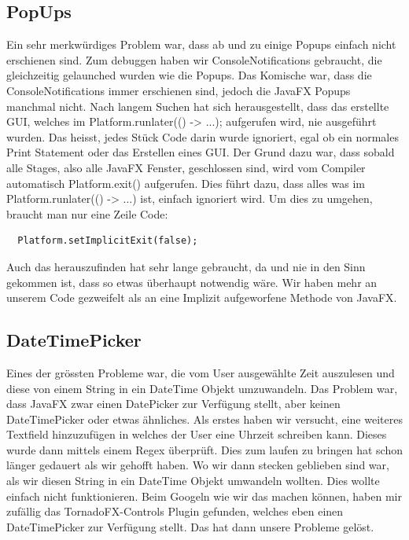 \documentclass[11pt,titelpage]{scrartcl}
\begin{document}
\subsection{PopUps}
Ein sehr merkwürdiges Problem war, dass ab und zu einige Popups einfach nicht erschienen sind. Zum debuggen haben wir ConsoleNotifications gebraucht, die gleichzeitig gelaunched wurden wie die Popups. Das Komische war, dass die ConsoleNotifications immer erschienen sind, jedoch die JavaFX Popups manchmal nicht. Nach langem Suchen hat sich herausgestellt,
dass das erstellte GUI, welches im Platform.runlater(() -> {...}); aufgerufen wird, nie ausgeführt wurden. Das heisst, jedes Stück Code darin wurde ignoriert, egal ob ein
normales Print Statement oder das Erstellen eines GUI. Der Grund dazu war, dass sobald alle Stages, also alle JavaFX Fenster, geschlossen sind, wird vom Compiler automatisch
Platform.exit() aufgerufen. Dies führt dazu, dass alles was im Platform.runlater(() -> {...}) ist, einfach ignoriert wird. Um dies zu umgehen, braucht man nur eine Zeile Code:
\begin{lstlisting}
  Platform.setImplicitExit(false);
\end{lstlisting}
Auch das herauszufinden hat sehr lange gebraucht, da und nie in den Sinn gekommen ist, dass so etwas überhaupt notwendig wäre. Wir haben mehr an unserem Code gezweifelt als an eine Implizit aufgeworfene Methode von JavaFX.
\subsection{DateTimePicker}
Eines der grössten Probleme war, die vom User ausgewählte Zeit auszulesen und diese von einem String in ein DateTime Objekt umzuwandeln. Das Problem war, dass JavaFX zwar einen
DatePicker zur Verfügung stellt, aber keinen DateTimePicker oder etwas ähnliches. Als erstes haben wir versucht, eine weiteres Textfield hinzuzufügen in welches der User eine
Uhrzeit schreiben kann. Dieses wurde dann mittels einem Regex überprüft. Dies zum laufen zu bringen hat schon länger gedauert als wir gehofft haben. Wo wir dann stecken geblieben sind
war, als wir diesen String in ein DateTime Objekt umwandeln wollten. Dies wollte einfach nicht funktionieren. Beim Googeln wie wir das machen können, haben mir zufällig das
TornadoFX-Controls Plugin gefunden, welches eben einen DateTimePicker zur Verfügung stellt. Das hat dann unsere Probleme gelöst.
\end{document}
